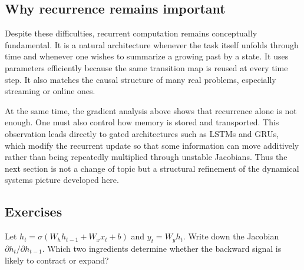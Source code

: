\subsection*{Why recurrence remains important}

Despite these difficulties, recurrent computation remains conceptually fundamental.
It is a natural architecture whenever the task itself unfolds through time and whenever one wishes to summarize a growing past by a state.
It uses parameters efficiently because the same transition map is reused at every time step.
It also matches the causal structure of many real problems, especially streaming or online ones.

\medskip

At the same time, the gradient analysis above shows that recurrence alone is not enough.
One must also control how memory is stored and transported.
This observation leads directly to gated architectures such as LSTMs and GRUs, which modify the recurrent update so that some information can move additively rather than being repeatedly multiplied through unstable Jacobians.
Thus the next section is not a change of topic but a structural refinement of the dynamical systems picture developed here.



\subsection*{Exercises}

\begin{exercise}
Let $h_t = \sigma(W_h h_{t-1} + W_x x_t + b)$ and $y_t = W_y h_t$.
Write down the Jacobian $\partial h_t/\partial h_{t-1}$.
Which two ingredients determine whether the backward signal is likely to contract or expand?
\end{exercise}

